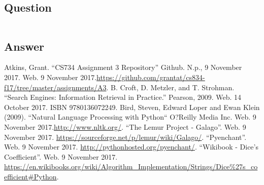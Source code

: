 \documentclass[letterpaper,11pt]{article}
\begin{document}
\subsection*{Question}

\begin{verbatim}

\end{verbatim}

\subsection*{Answer}


\clearpage


\clearpage



\begin{thebibliography}{9}
Atkins, Grant. ``CS734 Assignment 3 Repository'' Github. N.p., 9 November 2017. Web. 9 November 2017.\url{https://github.com/grantat/cs834-f17/tree/master/assignments/A3}.
B. Croft, D. Metzler, and T. Strohman. ``Search Engines: Information Retrieval in Practice.'' Pearson, 2009. Web. 14 October 2017. ISBN 9780136072249.
Bird, Steven, Edward Loper and Ewan Klein (2009). ``Natural Language Processing with Python`` O?Reilly Media Inc. Web. 9 November 2017.\url{http://www.nltk.org/}.
``The Lemur Project - Galago''. Web. 9 November 2017. \url{https://sourceforge.net/p/lemur/wiki/Galago/}.
``Pyenchant''. Web. 9 November 2017. \url{http://pythonhosted.org/pyenchant/}.
``Wikibook - Dice's Coefficient''. Web. 9 November 2017. \url{https://en.wikibooks.org/wiki/Algorithm_Implementation/Strings/Dice%27s_coefficient#Python}.
\end{thebibliography}
\end{document}
